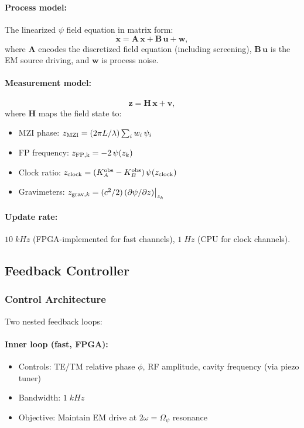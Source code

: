 \documentclass[11pt,a4paper]{article}
\begin{document}
\paragraph{Process model:}
The linearized $\psi$ field equation in matrix form:
\begin{equation}
\dot{\mathbf{x}} = \mathbf{A}\,\mathbf{x} + \mathbf{B}\,\mathbf{u}
+ \mathbf{w},
\end{equation}
where $\mathbf{A}$ encodes the discretized field equation
(including screening), $\mathbf{B}\,\mathbf{u}$ is the EM
source driving, and $\mathbf{w}$ is process noise.

\paragraph{Measurement model:}
\begin{equation}
\mathbf{z} = \mathbf{H}\,\mathbf{x} + \mathbf{v},
\end{equation}
where $\mathbf{H}$ maps the field state to:
\begin{itemize}[nosep]
\item MZI phase: $z_{\rm MZI} = (2\pi L/\lambda)\sum_i w_i\,\psi_i$
\item FP frequency: $z_{\rm FP,k} = -2\,\psi(z_k)$
\item Clock ratio: $z_{\rm clock} = (K_A^{\rm obs} - K_B^{\rm obs})
\,\psi(z_{\rm clock})$
\item Gravimeters: $z_{{\rm grav},k} = (c^2/2)\,(\partial\psi/\partial z)
\big|_{z_k}$
\end{itemize}

\paragraph{Update rate:} $10\;\si{kHz}$ (FPGA-implemented
for fast channels), $1\;\si{Hz}$ (CPU for clock channels).

\subsection{Feedback Controller}

\subsubsection{Control Architecture}

Two nested feedback loops:

\paragraph{Inner loop (fast, FPGA):}
\begin{itemize}[nosep]
\item Controls: TE/TM relative phase $\phi$, RF amplitude,
cavity frequency (via piezo tuner)
\item Bandwidth: $1\;\si{kHz}$
\item Objective: Maintain EM drive at $2\omega = \Omega_\psi$
resonance
\end{itemize}
\end{document}
